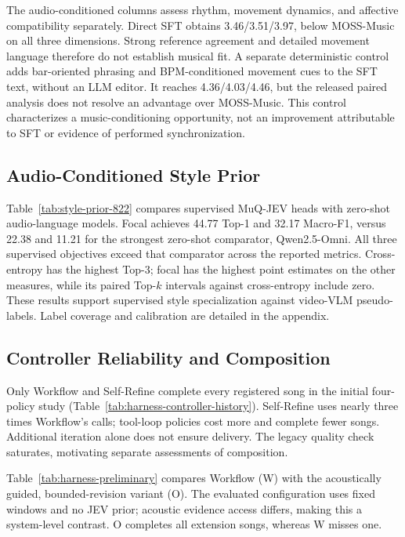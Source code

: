 The audio-conditioned columns assess rhythm, movement dynamics, and
affective compatibility separately. Direct SFT obtains 3.46/3.51/3.97,
below MOSS-Music on all three dimensions. Strong reference agreement
and detailed movement language therefore do not establish musical fit.
A separate deterministic control adds bar-oriented phrasing and
BPM-conditioned movement cues to the SFT text, without an LLM editor.
It reaches 4.36/4.03/4.46, but the released paired analysis does not
resolve an advantage over MOSS-Music. This control characterizes a
music-conditioning opportunity, not an improvement attributable to SFT
or evidence of performed synchronization.

\subsection{Audio-Conditioned Style Prior}
\label{sec:exp-jev}
Table~\ref{tab:style-prior-822} compares supervised MuQ-JEV heads with
zero-shot audio-language models. Focal achieves 44.77 Top-1 and 32.17
Macro-F1, versus 22.38 and 11.21 for the strongest zero-shot comparator,
Qwen2.5-Omni. All three supervised objectives exceed that comparator
across the reported metrics. Cross-entropy has the highest Top-3;
focal has the highest point estimates on the other measures, while its
paired Top-$k$ intervals against cross-entropy include zero. These
results support supervised style specialization against video-VLM
pseudo-labels. Label coverage and calibration are detailed in the appendix.

\subsection{Controller Reliability and Composition}
\label{sec:exp-harness}

Only Workflow and Self-Refine complete every registered song in the
initial four-policy study (Table~\ref{tab:harness-controller-history}).
Self-Refine uses nearly three times Workflow's calls; tool-loop
policies cost more and complete fewer songs. Additional iteration alone
does not ensure delivery. The legacy quality check saturates,
motivating separate assessments of composition.

Table~\ref{tab:harness-preliminary} compares Workflow (W) with the
acoustically guided, bounded-revision variant (O). The evaluated
configuration uses fixed windows and no JEV prior; acoustic evidence
access differs, making this a system-level contrast. O completes all
extension songs, whereas W misses one.

